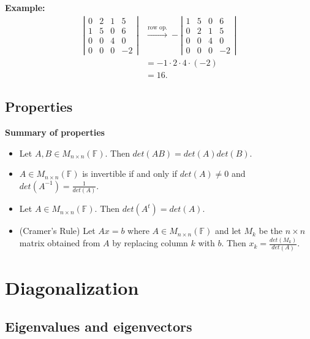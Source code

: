 \documentclass[12pt]{article}
\begin{document}
\vspace{1em}

\noindent\textbf{Example:} \begin{align*}
    \left| \begin{array}{cccc}
         0 & 2 & 1 & 5 \\ 1 & 5 & 0 & 6 \\ 0 & 0 & 4 & 0 \\ 0 & 0 & 0 & -2
    \end{array} \right| &\xrightarrow{\text{row op.}} - \left| \begin{array}{cccc}
         1 & 5 & 0 & 6 \\ 0 & 2 & 1 & 5 \\ 0 & 0 & 4 & 0 \\ 0 & 0 & 0 & -2
    \end{array} \right| \\ 
    &= -1 \cdot 2 \cdot 4 \cdot (-2) \\ 
    &= 16.
\end{align*}

\subsection{Properties}

\textbf{Summary of properties}

\begin{itemize}
    \item Let $A, B \in M_{n \times n}(\mathbb{F})$. Then $det(AB) = det(A)det(B)$. 
    
    \item $A \in M_{n \times n}(\mathbb{F})$ is invertible if and only if $det(A) \neq 0$ and $det(A^{-1}) = \frac{1}{det(A)}$.
    
    \item Let $A \in M_{n \times n}(\mathbb{F})$. Then $det(A^t) = det(A)$.
    
    \item (Cramer's Rule) Let $Ax = b$ where $A \in M_{n \times n}(\mathbb{F})$ and let $M_k$ be the $n \times n$ matrix obtained from $A$ by replacing column $k$ with $b$. Then $x_k = \frac{det(M_k)}{det(A)}$.
\end{itemize}

\section{Diagonalization}

\subsection{Eigenvalues and eigenvectors}
\end{document}
